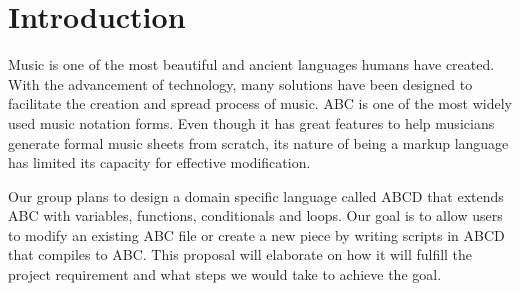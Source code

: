 \section{Introduction}

Music is one of the most beautiful and ancient languages humans have created. With the advancement of technology, many solutions have been designed to facilitate the creation and spread process of music. ABC is one of the most widely used music notation forms. Even though it has great features to help musicians generate formal music sheets from scratch, its nature of being a markup language has limited its capacity for effective modification.

Our group plans to design a domain specific language called ABCD that extends ABC with variables, functions, conditionals and loops. Our goal is to allow users to modify an existing ABC file or create a new piece by writing scripts in ABCD that compiles to ABC. This proposal will elaborate on how it will fulfill the project requirement and what steps we would take to achieve the goal.
